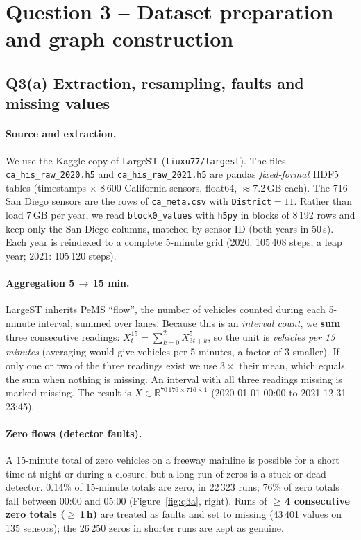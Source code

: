 \documentclass[11pt,a4paper]{article}
\begin{document}
\tableofcontents
\newpage



\section{Question 3 -- Dataset preparation and graph construction}

\subsection{Q3(a) Extraction, resampling, faults and missing values}
\paragraph{Source and extraction.} We use the Kaggle copy of LargeST (\texttt{liuxu77/largest}). The files
\texttt{ca\_his\_raw\_2020.h5} and \texttt{ca\_his\_raw\_2021.h5} are pandas \emph{fixed-format} HDF5 tables
(timestamps $\times$ 8\,600 California sensors, float64, $\approx$7.2\,GB each). The 716 San Diego sensors
are the rows of \texttt{ca\_meta.csv} with \texttt{District}$=11$. Rather than load 7\,GB per year, we read
\texttt{block0\_values} with \texttt{h5py} in blocks of 8\,192 rows and keep only the San Diego columns, matched
by sensor ID (both years in 50\,s). Each year is reindexed to a complete 5-minute grid (2020: 105\,408 steps, a
leap year; 2021: 105\,120 steps).

\paragraph{Aggregation 5\,$\to$\,15 min.} LargeST inherits PeMS ``flow'', the number of vehicles counted during
each 5-minute interval, summed over lanes. Because this is an \emph{interval count}, we \textbf{sum} three
consecutive readings: $X^{15}_t=\sum_{k=0}^{2}X^{5}_{3t+k}$, so the unit is \emph{vehicles per 15 minutes}
(averaging would give vehicles per 5 minutes, a factor of 3 smaller). If only one or two of the three readings
exist we use $3\times$ their mean, which equals the sum when nothing is missing. An interval with all three readings
missing is marked missing. The result is $X\in\mathbb R^{70\,176\times716\times1}$ (2020-01-01 00:00 to 2021-12-31 23:45).

\paragraph{Zero flows (detector faults).} A 15-minute total of zero vehicles on a freeway mainline is possible for a
short time at night or during a closure, but a long run of zeros is a stuck or dead detector. 0.14\% of 15-minute
totals are zero, in 22\,323 runs; 76\% of zero totals fall between 00:00 and 05:00 (Figure~\ref{fig:q3a}, right).
Runs of \textbf{$\geq$\,4 consecutive zero totals ($\geq$\,1\,h)} are treated as faults and set to missing
(43\,401 values on 135 sensors); the 26\,250 zeros in shorter runs are kept as genuine.
\end{document}
